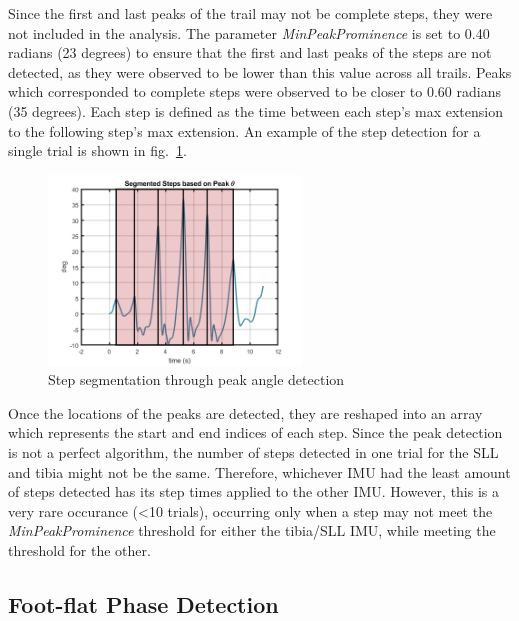 \documentclass[defaultstyle,11pt]{comps}
\begin{document}
Since the first and last peaks of the trail may not be complete steps, they were not included in the analysis.
The parameter \emph{MinPeakProminence} is set to 0.40 radians (23 degrees) to ensure that the first and last peaks of the steps are not detected, as they were observed to be lower than this value across all trails.
Peaks which corresponded to complete steps were observed to be closer to 0.60 radians (35 degrees).
Each step is defined as the time between each step's max extension to the following step's max extension.
An example of the step detection for a single trial is shown in fig.~\ref{fig:SA1-StepSeg}.

\begin{figure}
\hypertarget{fig:SA1-StepSeg}{%
\centering
\includegraphics[width=0.6\textwidth,height=\textheight]{../fig/SA1/S3C0T1R_Steps.png}
\caption{Step segmentation through peak angle detection}\label{fig:SA1-StepSeg}
}
\end{figure}

Once the locations of the peaks are detected, they are reshaped into an array which represents the start and end indices of each step.
Since the peak detection is not a perfect algorithm, the number of steps detected in one trial for the SLL and tibia might not be the same.
Therefore, whichever IMU had the least amount of steps detected has its step times applied to the other IMU.
However, this is a very rare occurance (\textless10 trials), occurring only when a step may not meet the \emph{MinPeakProminence} threshold for either the tibia/SLL IMU, while meeting the threshold for the other.

\hypertarget{foot-flat-phase-detection}{%
\subsection{Foot-flat Phase Detection}\label{foot-flat-phase-detection}}
\end{document}
